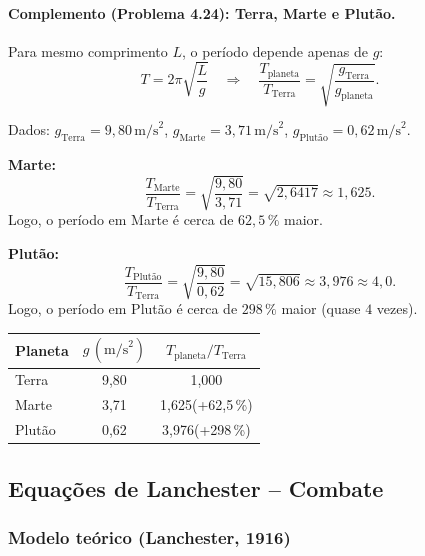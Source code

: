 \documentclass[12pt,a4paper]{article}
\theoremstyle{definition}
\begin{document}
\paragraph{Complemento (Problema 4.24): Terra, Marte e Plut\~ao.}
Para mesmo comprimento $L$, o per\'iodo depende apenas de $g$:
\begin{equation}
  T = 2\pi\sqrt{\frac{L}{g}}
  \quad\Longrightarrow\quad
  \frac{T_{\text{planeta}}}{T_{\text{Terra}}}
  = \sqrt{\frac{g_{\text{Terra}}}{g_{\text{planeta}}}}.
\end{equation}

Dados: $g_{\text{Terra}}=9{,}80\,\text{m/s}^2$, $g_{\text{Marte}}=3{,}71\,\text{m/s}^2$,
$g_{\text{Plut\~ao}}=0{,}62\,\text{m/s}^2$.

\textbf{Marte:}
\begin{equation}
  \frac{T_{\text{Marte}}}{T_{\text{Terra}}}
  = \sqrt{\frac{9{,}80}{3{,}71}}
  = \sqrt{2{,}6417}
  \approx 1{,}625.
\end{equation}
Logo, o per\'iodo em Marte \'e cerca de $62{,}5\,\%$ maior.

\textbf{Plut\~ao:}
\begin{equation}
  \frac{T_{\text{Plut\~ao}}}{T_{\text{Terra}}}
  = \sqrt{\frac{9{,}80}{0{,}62}}
  = \sqrt{15{,}806}
  \approx 3{,}976 \approx 4{,}0.
\end{equation}
Logo, o per\'iodo em Plut\~ao \'e cerca de $298\,\%$ maior (quase $4$ vezes).

\begin{center}
\begin{tabular}{lcc}
\toprule
Planeta & $g\,(\text{m/s}^2)$ & $T_{\text{planeta}}/T_{\text{Terra}}$ \\
\midrule
Terra  & 9{,}80 & 1{,}000 \\
Marte  & 3{,}71 & 1{,}625\;(+62{,}5\,\%) \\
Plut\~ao & 0{,}62 & 3{,}976\;(+298\,\%) \\
\bottomrule
\end{tabular}
\end{center}

\subsection{Equa\c{c}\~oes de Lanchester -- Combate}

\subsubsection*{Modelo te\'orico (Lanchester, 1916)}
\end{document}
